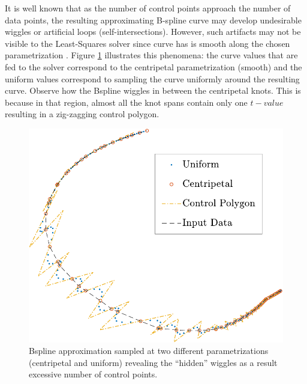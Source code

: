 It is well known that as the number of control points approach the number of data points, 
the resulting approximating B-spline curve may develop undesirable wiggles or artificial loops (self-intersections). 
However, such artifacts may not be visible to the Least-Squares solver since curve has is smooth along the chosen parametrization 
. Figure \ref{fig:bspline_wiggle} illustrates this phenomena: the curve values that 
 are fed to the solver correspond to the centripetal parametrization (smooth) and the uniform values correspond to 
 sampling the curve uniformly around the resulting curve. 
 Observe how the Bspline wiggles in between the centripetal knots. This is because in that region, almost all the 
 knot spans contain only one $t-value$ resulting in a zig-zagging control polygon.
 
 
 \begin{figure}
  
  \includegraphics{wiggle_ALL-crop}
  \caption{\label{fig:bspline_wiggle}Bspline approximation sampled at two different parametrizations (centripetal and uniform) revealing the ``hidden'' wiggles as a result excessive number 
  of control points.}
 \end{figure}

 
 
